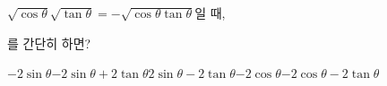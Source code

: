 $\sqrt{\cos\theta}\sqrt{\tan\theta}=-\sqrt{\cos\theta\tan\theta}$일 때, \par\smallskip{}\par\smallskip\noindent 를 간단히 하면? 
\begin{choicesii}{$-2\sin\theta$}{$-2\sin\theta+2\tan\theta$}{$2\sin\theta-2\tan\theta$}{$-2\cos\theta$}{$-2\cos\theta-2\tan\theta$}\end{choicesii}
